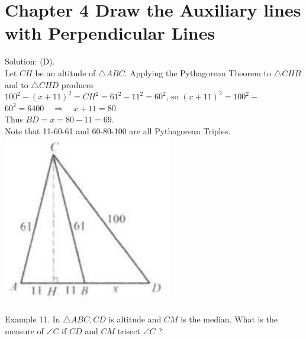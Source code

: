 \documentclass[10pt]{article}
\begin{document}
\section*{Chapter 4 Draw the Auxiliary lines with Perpendicular Lines}
Solution: (D).\\
Let \(C H\) be an altitude of \(\triangle A B C\). Applying the Pythagorean Theorem to \(\triangle C H B\) and to \(\triangle C H D\) produces\\
\(100^{2}-(x+11)^{2}=C H^{2}=61^{2}-11^{2}=60^{2}\), so \((x+11)^{2}=100^{2}-\) \(60^{2}=6400 \quad \Rightarrow \quad x+11=80\)\\
Thus \(B D=x=80-11=69\).\\
Note that 11-60-61 and 60-80-100 are all Pythagorean Triples.\\
\includegraphics[max width=\textwidth, center]{2025_04_17_97bc1f7e44d93c271a88g-081}

Example 11. In \(\triangle A B C, C D\) is altitude and \(C M\) is the median. What is the measure of \(\angle C\) if \(C D\) and \(C M\) trisect \(\angle C\) ?
\end{document}
